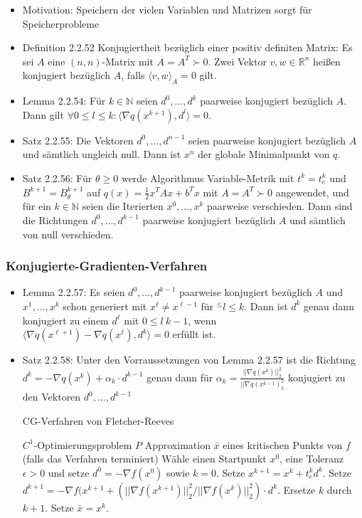 \documentclass[paper=a4, fontsize=11pt]{scrartcl} %
\numberwithin{equation}{section} %
\numberwithin{figure}{section} %
\numberwithin{table}{section} %
\begin{document}
\begin{itemize}
  \item Motivation: Speichern der vielen Variablen und Matrizen sorgt für Speicherprobleme
  \item Definition 2.2.52 Konjugiertheit bezüglich einer positiv definiten Matrix: Es sei $A$ eine $(n,n)$-Matrix mit $A = A^T \succ 0$. Zwei Vektor $v, w \in \mathbb{R}^n$ heißen konjugiert bezüglich $A$, falls $\langle v,w \rangle_A = 0$ gilt.
  \item Lemma 2.2.54: Für $k \in \mathbb{N}$ seien $d^0, ..., d^k$ paarweise konjugiert bezüglich $A$. Dann gilt $\forall 0 \le l \le k: \langle \nabla q(x^{k+1}),d^l\rangle = 0$.
  \item Satz 2.2.55: Die Vektoren $d^0, ..., d^{n-1}$ seien paarweise konjugiert bezüglich $A$ und sämtlich ungleich null. Dann ist $x^n$ der globale Minimalpunkt von $q$.
  \item Satz 2.2.56: Für $\theta \ge 0$ werde Algorithmus Variable-Metrik mit $t^k = t^k_e$ und $B^{k+1} = B^{k+1}_\theta$ auf $q(x) = \frac{1}{2} x^T Ax + b^T x$ mit $A = A^T \succ 0$ angewendet, und für ein $k \in \mathbb{N}$ seien die Iterierten $x^0, ..., x^k$ paarweise verschieden. Dann sind die Richtungen $d^0, ..., d^{k-1}$ paarweise konjugiert bezüglich $A$ und sämtlich von null verschieden.
\end{itemize}

\subsubsection{Konjugierte-Gradienten-Verfahren}

\begin{itemize}
  \item Lemma 2.2.57: Es seien $d^0, ..., d^{k-1}$ paarweise konjugiert bezüglich $A$ und $x^1, ..., x^k$ schon generiert mit $x^\ell \neq x^{\ell-1}$ für $^\le l \le k$. Dann ist $d^k$ genau dann konjugiert zu einem $d^\ell$ mit $0 \le l \ k-1$, wenn $\langle \nabla q(x^{\ell+1}) - \nabla q(x^\ell),d^k \rangle = 0$ erfüllt ist.
  \item Satz 2.2.58: Unter den Vorraussetzungen von Lemma 2.2.57 ist die Richtung $d^k = - \nabla q(x^k) + \alpha_k \cdot d^{k-1}$ genau dann für $\alpha_k = \frac{||\nabla q(x^k)||^2_2}{||\nabla q(x^{k-1})^2_2}$ konjugiert zu den Vektoren $d^0, ..., d^{k-1}$
  \begin{algorithm}
  \caption{CG-Verfahren von Fletcher-Reeves}
  \begin{algorithmic}[1]
    \Require $C^1$-Optimierungsproblem $P$
    \Ensure Approximation $\bar{x}$ eines kritischen Punkts von $f$ (falls das Verfahren terminiert)
    \State Wähle einen Startpunkt $x^0$, eine Toleranz $\epsilon > 0$ und setze $d^0 = - \nabla f(x^0)$ sowie $k = 0$.
    \State Setze $x^{k+1} = x^k + t^k_e d^k$.
    \State Setze $d^{k+1} = -\nabla f(x^{k+1} + (||\nabla f(x^{k+1})||^2_2 / ||\nabla f(x^k)||^2_2) \cdot d^k$.
    \State Ersetze $k$ durch $k+1$.
    \EndWhile
    \State Setze $\bar{x} = x^k$.
  \end{algorithmic}
  \end{algorithm}
\end{itemize}
\end{document}
